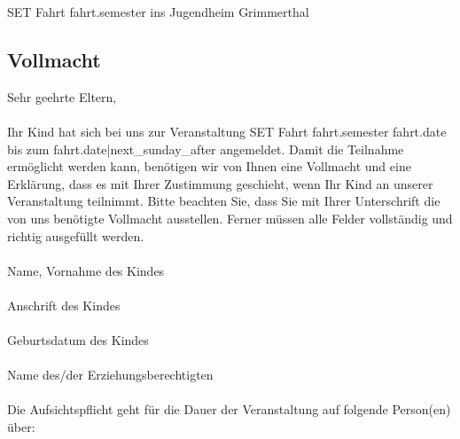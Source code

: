 {%
{%
{%

{%
SET Fahrt {{ fahrt.semester }} ins Jugendheim Grimmerthal {%

{%
    \subsection*{Vollmacht}
    Sehr geehrte Eltern,\\
    \\
    Ihr Kind hat sich bei uns zur Veranstaltung SET Fahrt {{ fahrt.semester }} {{ fahrt.date }} bis zum {{ fahrt.date|next_sunday_after }} angemeldet. Damit die Teilnahme ermöglicht werden kann, benötigen wir von Ihnen eine
    Vollmacht und eine Erklärung, dass es mit Ihrer Zustimmung geschieht, wenn Ihr Kind an unserer
    Veranstaltung teilnimmt. Bitte beachten Sie, dass Sie mit Ihrer Unterschrift die von uns benötigte
    Vollmacht ausstellen. Ferner müssen alle Felder vollständig und richtig ausgefüllt werden.\\
    \\
    \TextField[charsize={12pt},multiline=true,height={1cm},width={\linewidth},name={name},bordercolor={0.2 0.2 0.7},default={ {{ participant.surname|latex_escape }}, {{ participant.firstname|latex_escape }}}]{}\newline
    Name, Vornahme des Kindes\\
    \\
    \TextField[charsize={12pt},multiline=true,height={1cm},width={\linewidth},name={adress},bordercolor={0.2 0.2 0.7}]{}\newline
    Anschrift des Kindes\\
    \\
    \TextField[charsize={12pt},multiline=true,height={1cm},width={\linewidth},name={birthday},bordercolor={0.2 0.2 0.7},default={ {{ participant.birthday }}}]{}\newline
    Geburtsdatum des Kindes\\
    \\
    \TextField[charsize={12pt},multiline=true,height={1cm},width={\linewidth},name={guardian},bordercolor={0.2 0.2 0.7}]{}\newline
    Name des/der Erziehungsberechtigten\\
    \\
    Die Aufsichtspflicht geht für die Dauer der Veranstaltung auf folgende Person(en) über:\\
}}}}}}

